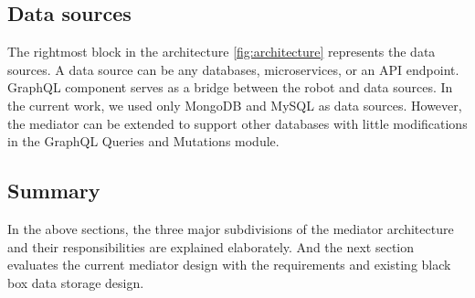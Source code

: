 	\subsection{Data sources} 
	The rightmost block in the architecture \ref{fig:architecture} represents the data sources. A data source can be any databases, microservices, or an API endpoint. GraphQL component serves as a bridge between the robot and data sources. In the current work, we used only MongoDB and MySQL as data sources. However, the mediator can be extended to support other databases with little modifications in the GraphQL Queries and Mutations module.
	
	\subsection{Summary}
	In the above sections, the three major subdivisions of the mediator architecture and their responsibilities are explained elaborately. And the next section evaluates the current mediator design with the requirements and existing black box data storage design.
	

